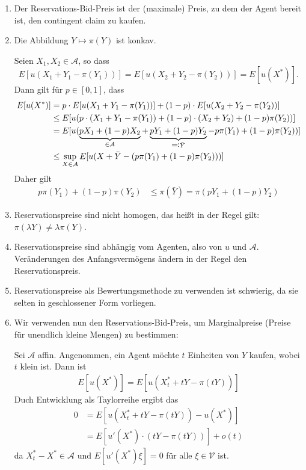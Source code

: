 \documentclass[a4paper,twoside,DIV15,BCOR12mm]{scrbook}
\newcommand{\cA}{\mathcal A}
\newcommand{\cV}{\mathcal V}
\begin{document}
\begin{bemerkung}
\begin{enumerate}
\item Der Reservations-Bid-Preis ist der (maximale) Preis, zu dem der Agent bereit ist, den contingent claim zu kaufen.
\item Die Abbildung $Y\mapsto\pi(Y)$ ist konkav.
\begin{beweis}
Seien $X_1,X_2\in\cA$, so dass
\[E[u(X_1 + Y_1 - \pi(Y_1))] = E[u(X_2+Y_2-\pi(Y_2))] = E[u(X^*)].\]
Dann gilt für $p\in[0, 1]$, dass
\begin{align*}
E[u(X^*)] &= p\cdot E[u(X_1+Y_1-\pi(Y_1))] + (1-p)\cdot E[u(X_2+Y_2-\pi(Y_2))]\\
&\le E[u(p\cdot(X_1+Y_1-\pi(Y_1)) + (1-p)\cdot(X_2+Y_2) + (1-p)\pi(Y_2))] \\
&= E[u(\underbrace{p X_1 + (1-p) X_2}_{\in\cA} + \underbrace{p Y_1 + (1-p)Y_2}_{\ad \bar Y} - p \pi(Y_1) + (1-p) \pi(Y_2))] \\
&\le \sup_{X\in\cA} E[u(X + \bar Y - (p\pi(Y_1) + (1-p) \pi(Y_2)))]
\end{align*}
Daher gilt
\begin{align*}
p\pi(Y_1)+ (1-p)\pi(Y_2) &\le \pi(\bar Y) =\pi (p Y_1 + (1-p)Y_2)
\end{align*}
\end{beweis}

\item Reservationspreise sind nicht homogen, das heißt in der Regel gilt: $\pi(\lambda Y) \ne \lambda \pi(Y)$.
\item Reservationspreise sind abhängig vom Agenten, also von $u$ und $\cA$. Veränderungen des Anfangsvermögens ändern in der Regel den Reservationspreis.
\item Reservationspreise als Bewertungsmethode zu verwenden ist schwierig, da sie selten in geschlossener Form vorliegen.
\item Wir verwenden nun den Reservations-Bid-Preis, um Marginalpreise (Preise für unendlich kleine Mengen) zu bestimmen:

Sei $\cA$ affin. Angenommen, ein Agent möchte $t$ Einheiten von $Y$ kaufen, wobei $t$ klein ist. Dann ist 
\begin{align*}
E[u(X^*)]=E[u(X_t^* + tY - \pi(tY))]
\end{align*}
Duch Entwicklung als Taylorreihe ergibt das
\begin{align*}
0
&= E[u(X_t^* + tY -\pi(tY)) - u(X^*)] \\
&= E[u'(X^*) \cdot (tY - \pi(tY))] + o(t)
\end{align*}
da $X_t^* - X^*\in\cA$ und $E[u'(X^*)\xi]=0$ für alle $\xi\in\cV$ ist.


\end{enumerate}
\end{bemerkung}
\end{document}
